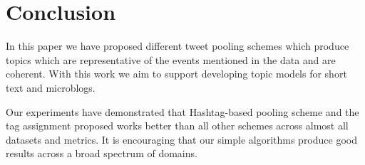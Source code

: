 \documentclass[10pt,a5paper,twoside]{article}
\begin{document}
\section{Conclusion}
In this paper we have proposed different tweet pooling schemes which produce topics which are representative of the events mentioned in the data and are coherent. With this work we aim to support %
developing topic models for short text and microblogs. %

Our experiments have demonstrated that Hashtag-based pooling scheme and the tag assignment proposed works better than all other schemes across almost all datasets and metrics. It is encouraging that our simple algorithms produce good results across a broad spectrum of domains.

%


%
%




%
%




%

\end{document}
